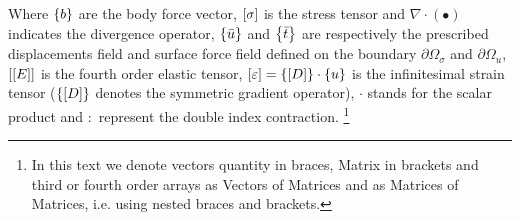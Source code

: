 Where $\left\lbrace{b}\right \rbrace$ are the body force vector, $\left[{\sigma}\right]$ is the stress tensor and $\nabla \cdot (\bullet)$ indicates the divergence operator, $\left\lbrace{\bar{u}}\right \rbrace$ and $\left\lbrace{\bar{t}}\right \rbrace$ are respectively the prescribed displacements field and surface force field defined on the boundary $ \partial \Omega_{\sigma}$ and $ \partial \Omega_{u}$, $\left[{\left[{E}\right]}\right]$ is the fourth order elastic tensor, $\left[{\varepsilon}\right] = \left\lbrace{\ensuremath\left[{D}\right]}\right \rbrace \cdot\left\lbrace{u}\right \rbrace $ is the infinitesimal strain tensor ($\left\lbrace{\ensuremath\left[{D}\right]}\right \rbrace$ denotes the symmetric gradient operator), $\cdot$ stands for the scalar product and $:$ represent the double index contraction. \footnote{In this text we denote vectors quantity in braces, Matrix in brackets and third or fourth order arrays as Vectors of Matrices and as Matrices of Matrices, i.e. using nested braces and brackets.}\\

